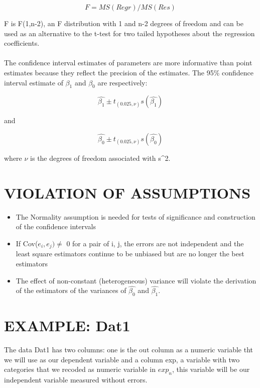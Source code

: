 \documentclass[letterpaper,11pt]{article}
\begin{document}
	\begin{equation}
	F=MS(Regr) / MS(Res)
	\end{equation}	
	
	F is F(1,n-2), an F distribution with 1 and n-2 degrees of freedom and can be used as an alternative to the t-test for two tailed 
	hypotheses about the regression coefficients. 
	\\ \\
	
	The confidence interval estimates of parameters are more informative than point estimates because they reflect the precision of the estimates. The 95\% confidence interval estimate of $\beta_{1}$ and $\beta_{0}$ are respectively:
	
	\begin{equation}
	\hat{\beta_{1}} \pm t_{(0.025, \nu)} s (\hat{\beta_{1}})
	\end{equation}		
	
	and
	
	\begin{equation}
	\hat{\beta_{0}} \pm t_{(0.025, \nu)} s (\hat{\beta_{0}})
	\end{equation}		
		
			where $\nu$ is the degrees of freedom associated with s^2.
			
\section{VIOLATION OF ASSUMPTIONS}

	\begin{itemize}
		\item The Normality assumption is needed for tests of significance and construction of the confidence intervals
		\item If Cov($e_{i}, e_{j}) \neq$ 0 for a pair of i, j, the errors are not independent and the least square estimators continue to be 		
					unbiased but are no longer the best estimators
		\item The effect of non-constant (heterogeneous) variance will violate the derivation of the estimators of the variances of $\hat{\beta_{
					0}}$ and $\hat{\beta_{1}}$.	
	\end{itemize}


\section{EXAMPLE: Dat1}
	
	The data Dat1 has two columns: one is the out column as a numeric variable tht we will use as our dependent variable and a column 
	exp, a variable with two categories that we recoded as numeric variable in $exp_n$, this variable will be our independent variable 
	measured without errors.
	
\end{document}
